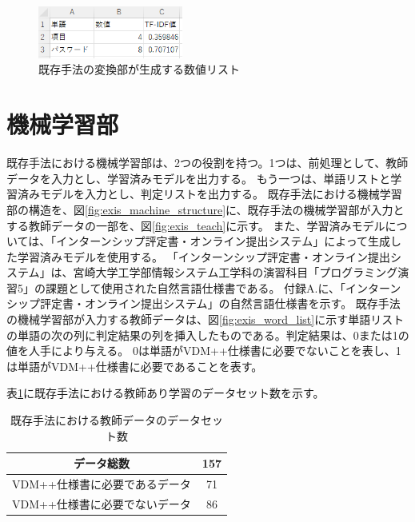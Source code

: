 \begin{figure}[tp]
    \begin{center}
        \includegraphics[width=180]{image/exis_suti_list.png}
        \caption{既存手法の変換部が生成する数値リスト}
        \label{fig:exis_suti_list}
    \end{center}
\end{figure}

\section{機械学習部}
\label{sec:exis_machine}
既存手法における機械学習部は、2つの役割を持つ。1つは、前処理として、教師データを入力とし、学習済みモデルを出力する。
もう一つは、単語リストと学習済みモデルを入力とし、判定リストを出力する。
既存手法における機械学習部の構造を、図\ref{fig:exis_machine_structure}に、既存手法の機械学習部が入力とする教師データの一部を、図\ref{fig:exis_teach}に示す。
また、学習済みモデルについては、「インターンシップ評定書・オンライン提出システム」によって生成した学習済みモデルを使用する。
「インターンシップ評定書・オンライン提出システム」は、宮崎大学工学部情報システム工学科の演習科目「プログラミング演習5」の課題として使用された自然言語仕様書である。
付録A.に、「インターンシップ評定書・オンライン提出システム」の自然言語仕様書を示す。
既存手法の機械学習部が入力する教師データは、図\ref{fig:exis_word_list}に示す単語リストの単語の次の列に判定結果の列を挿入したものである。判定結果は、0または1の値を人手により与える。
0は単語がVDM++仕様書に必要でないことを表し、1は単語がVDM++仕様書に必要であることを表す。

表\ref{table:exis_data_set}に既存手法における教師あり学習のデータセット数を示す。

\begin{table}[t]
    \begin{center}
      \caption{既存手法における教師データのデータセット数}
      \label{table:exis_data_set}
      \begin{tabular}{c|c}
        データ総数　& 157\\
        \hline
        \hline
        VDM++仕様書に必要であるデータ    & 71\\ \hline
        VDM++仕様書に必要でないデータ & 86\\ \hline
      \end{tabular}
    \end{center}
  \end{table}

